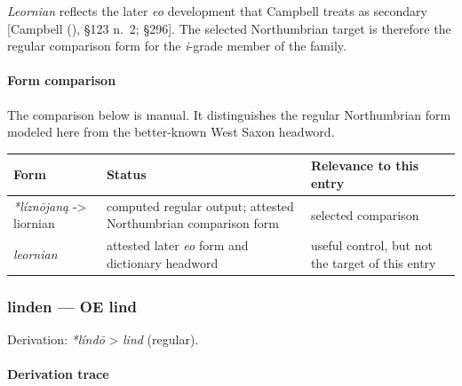 \documentclass[
  british,
  a4paper,
]{article}
\newcounter{none} %
\begin{document}
\emph{Leornian} reflects the later \emph{eo} development that Campbell
treats as secondary {[}Campbell (),
§123 n.~2; §296{]}. The selected Northumbrian target is therefore the
regular comparison form for the \emph{i}-grade member of the family.

\paragraph{Form comparison}\label{form-comparison-1}

The comparison below is manual. It distinguishes the regular
Northumbrian form modeled here from the better-known West Saxon
headword.

{\def\LTcaptype{none} %
\begin{longtable}[]{@{}
  >{\raggedright\arraybackslash}p{}
  >{\raggedright\arraybackslash}p{}
  >{\raggedright\arraybackslash}p{}@{}}
\toprule\noalign{}
\begin{minipage}[b]{\linewidth}\raggedright
Form
\end{minipage} & \begin{minipage}[b]{\linewidth}\raggedright
Status
\end{minipage} & \begin{minipage}[b]{\linewidth}\raggedright
Relevance to this entry
\end{minipage} \\
\midrule\noalign{}
\endhead
\bottomrule\noalign{}
\endlastfoot
\emph{*líznōjaną} -\textgreater{} liornian & computed regular output;
attested Northumbrian comparison form & selected comparison \\
\emph{leornian} & attested later \emph{eo} form and dictionary headword
& useful control, but not the target of this entry \\
\end{longtable}
}

\subsubsection{linden --- OE lind}\label{linden-oe-lind}

Derivation: \emph{*líndō} \textgreater{} \emph{lind} (regular).

\paragraph{Derivation trace}\label{derivation-trace-8}
\end{document}

